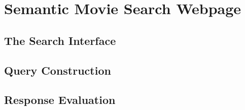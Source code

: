 \section{Semantic Movie Search Webpage}

\subsection{The Search Interface}

\subsection{Query Construction}

\subsection{Response Evaluation}

